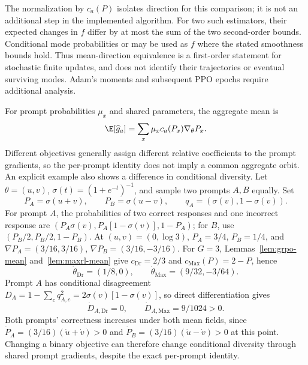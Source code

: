The normalization by $c_a(P)$ isolates direction for this comparison; it is
not an additional step in the implemented algorithm. For two such estimators,
their expected changes in $f$ differ by at most the sum of the two
second-order bounds. Conditional mode probabilities or \pmd{} may be used
as $f$ where the stated smoothness bounds hold. Thus mean-direction
equivalence is a first-order statement for stochastic finite updates, and
does not identify their trajectories or eventual surviving modes. Adam's
moments and subsequent PPO epochs require additional analysis.

\begin{remark}
\label{rem:neural-binary-shared-prompts}
For prompt probabilities $\mu_x$ and shared parameters, the aggregate mean is
\begin{equation}
 \E[\widehat g_a]
 =\sum_x\mu_x c_a(P_x)\nabla_\theta P_x.
 \label{eq:neural-binary-prompt-sum}
\end{equation}
Different objectives generally assign different relative coefficients to
the prompt gradients, so the per-prompt identity does not imply a common
aggregate orbit. An explicit example also shows a difference in conditional
diversity. Let $\theta=(u,v)$, $\sigma(t)=(1+e^{-t})^{-1}$, and sample two
prompts $A,B$ equally. Set
\[
 P_A=\sigma(u+v),\qquad P_B=\sigma(u-v),\qquad
 q_A=(\sigma(v),1-\sigma(v)).
\]
For prompt $A$, the probabilities of two correct responses and one incorrect
response are $(P_A\sigma(v),P_A[1-\sigma(v)],1-P_A)$; for $B$, use
$(P_B/2,P_B/2,1-P_B)$. At $(u,v)=(0,\log3)$,
$P_A=3/4$, $P_B=1/4$, and
$\nabla P_A=(3/16,3/16)$, $\nabla P_B=(3/16,-3/16)$.
For $G=3$, Lemmas~\ref{lem:grpo-mean} and~\ref{lem:maxrl-mean} give
$c_{\mathrm{Dr}}=2/3$ and $c_{\mathrm{Max}}(P)=2-P$, hence
\[
 \dot\theta_{\mathrm{Dr}}=(1/8,0),\qquad
 \dot\theta_{\mathrm{Max}}=(9/32,-3/64).
\]
Prompt $A$ has conditional disagreement
$D_A=1-\sum_cq_{A,c}^2=2\sigma(v)[1-\sigma(v)]$, so direct
differentiation gives
\[
 \dot D_{A,\mathrm{Dr}}=0,\qquad
 \dot D_{A,\mathrm{Max}}=9/1024>0.
\]
Both prompts' correctness increases under both mean fields, since
$\dot P_A=(3/16)(\dot u+\dot v)>0$ and
$\dot P_B=(3/16)(\dot u-\dot v)>0$ at this point. Changing a binary
objective can therefore change conditional diversity through shared prompt
gradients, despite the exact per-prompt identity.
\end{remark}

